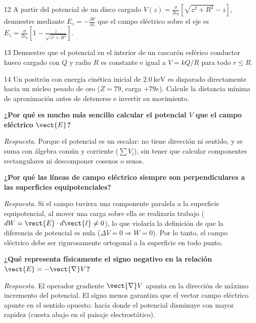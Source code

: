 \documentclass[11pt]{article}
\begin{document}
\begin{eReto}{12 }
A partir del potencial de un disco cargado $V(z)=\frac{\sigma}{2\epsilon_0}\left[\sqrt{z^2+R^2}-z\right]$, demuestre mediante $E_z=-\frac{\partial V}{\partial z}$ que el campo eléctrico sobre el eje es $E_z=\frac{\sigma}{2\epsilon_0}\left[1-\frac{z}{\sqrt{z^2+R^2}}\right]$.
\end{eReto}

\begin{eReto}{13 }
Demuestre que el potencial en el interior de un cascarón esférico conductor hueco cargado con $Q$ y radio $R$ es constante e igual a $V=kQ/R$ para todo $r\le R$.
\end{eReto}

\begin{eReto}{14 }
Un positrón con energía cinética inicial de $\SI{2,0}{\kilo\electronvolt}$ es disparado directamente hacia un núcleo pesado de oro ($Z=79$, carga $+79e$). Calcule la distancia mínima de aproximación antes de detenerse e invertir su movimiento.
\end{eReto}


\begin{eTeoria}
\textbf{¿Por qué es mucho más sencillo calcular el potencial $V$ que el campo eléctrico $\vect{E}$?}\par
\emph{Respuesta.} Porque el potencial es un escalar: no tiene dirección ni sentido, y se suma con álgebra común y corriente ($\sum V_i$), sin tener que calcular componentes rectangulares ni descomponer cosenos o senos.
\end{eTeoria}

\begin{eTeoria}
\textbf{¿Por qué las líneas de campo eléctrico siempre son perpendiculares a las superficies equipotenciales?}\par
\emph{Respuesta.} Si el campo tuviera una componente paralela a la superficie equipotencial, al mover una carga sobre ella se realizaría trabajo ($dW=\vect{E}\cdot d\vect{\ell}\neq0$), lo que violaría la definición de que la diferencia de potencial es nula ($\Delta V=0\Rightarrow W=0$). Por lo tanto, el campo eléctrico debe ser rigurosamente ortogonal a la superficie en todo punto.
\end{eTeoria}

\begin{eTeoria}
\textbf{¿Qué representa físicamente el signo negativo en la relación $\vect{E}=-\vect{\nabla}V$?}\par
\emph{Respuesta.} El operador gradiente $\vect{\nabla}V$ apunta en la dirección de máximo incremento del potencial. El signo menos garantiza que el vector campo eléctrico apunte en el sentido opuesto: hacia donde el potencial disminuye con mayor rapidez (cuesta abajo en el paisaje electrostático).
\end{eTeoria}
\end{document}
